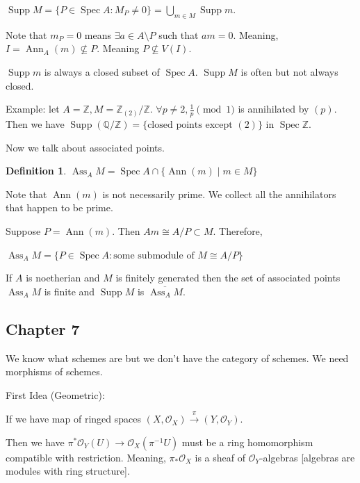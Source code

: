 \documentclass{article}
\theoremstyle{definition}
\newtheorem*{definition}{Definition}
\begin{document}
    \(\operatorname{Supp} M = \{ P \in \operatorname{Spec} A : M_P \neq 0 \} = \bigcup_{m\in M} \operatorname{Supp} m\).

    Note that \(m_P = 0\) means \(\exists a\in A \setminus P\) such that \(am = 0\). Meaning, \(I = \operatorname{Ann}_A(m) \nsubseteq P\). Meaning \(P \nsubseteq V(I)\).

    \(\operatorname{Supp} m\) is always a closed subset of \(\operatorname{Spec} A\). \(\operatorname{Supp} M\) is often but not always closed.

    Example: let \(A = \mathbb{Z}, M = \mathbb{Z}_{(2)} / \mathbb{Z}\). \(\forall p\neq 2, \frac{1}{p} \pmod 1\) is annihilated by \((p)\). Then we have \(\operatorname{Supp} (\mathbb{Q} / \mathbb{Z}) = \{ \text{closed points except } (2)\}\) in \(\operatorname{Spec} \mathbb{Z}\). 

    Now we talk about associated points.

    \begin{definition}
        \(\operatorname{Ass}_A M = \operatorname{Spec} A \cap \{ \operatorname{Ann} (m) \mid m \in M \}\)

        Note that \(\operatorname{Ann} (m)\) is not necessarily prime. We collect all the annihilators that happen to be prime.

        Suppose \(P = \operatorname{Ann} (m)\). Then \(Am \cong A / P \subset M\). Therefore,

        \(\operatorname{Ass}_A M = \{ P \in \operatorname{Spec} A : \text{some submodule of } M \cong A / P  \}\) 
    \end{definition}

    If \(A\) is noetherian and \(M\) is finitely generated then the set of associated points \(\operatorname{Ass}_A M\) is finite and \(\operatorname{Supp} M\) is \(\overline{\operatorname{Ass}_A M}\).

    \subsection*{Chapter 7}

    We know what schemes are but we don't have the category of schemes. We need morphisms of schemes.

    First Idea (Geometric):

    If we have map of ringed spaces \((X, \mathcal{O}_X) \xrightarrow{\pi} (Y, \mathcal{O}_Y)\).

    Then we have \(\pi^{\ast} \mathcal{O}_Y(U) \to \mathcal{O}_X (\pi ^{-1} U)\) must be a ring homomorphism compatible with restriction. Meaning, \(\pi_{\ast} \mathcal{O}_X\) is a sheaf of \(\mathcal{O}_Y\)-algebras [algebras are modules with ring structure].
\end{document}
